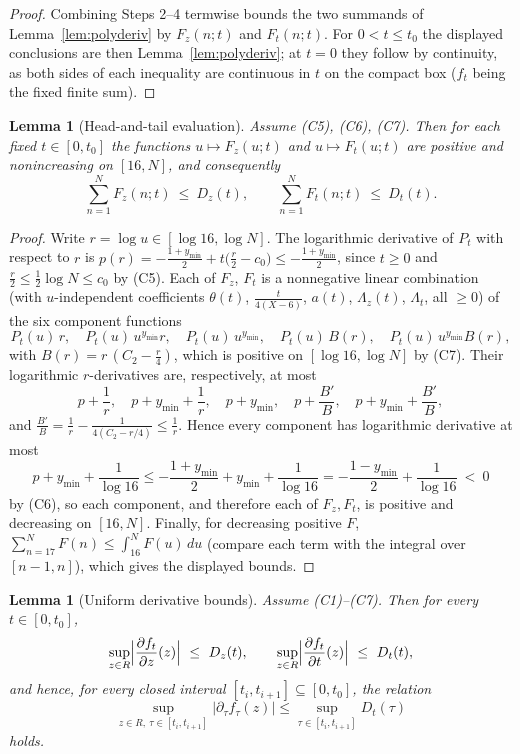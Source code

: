 \documentclass[11pt]{article}
\newtheorem{lemma}[theorem]{Lemma}
\theoremstyle{definition}
\begin{document}
\begin{proof}
Combining Steps 2--4 termwise bounds the two summands of
Lemma~\ref{lem:polyderiv} by $F_z(n;t)$ and $F_t(n;t)$. For
$0<t\le t_0$ the displayed conclusions are then
Lemma~\ref{lem:polyderiv}; at $t=0$ they follow by continuity, as
both sides of each inequality are continuous in $t$ on the compact
box ($f_t$ being the fixed finite sum).
\end{proof}

\begin{lemma}[Head-and-tail evaluation]\label{lem:headtail}
Assume (C5), (C6), (C7). Then for each fixed $t\in[0,t_0]$ the
functions $u\mapsto F_z(u;t)$ and $u\mapsto F_t(u;t)$ are positive
and nonincreasing on $[16,N]$, and consequently
\[
\sum_{n=1}^{N}F_z(n;t)\ \le\ D_z(t),
\qquad
\sum_{n=1}^{N}F_t(n;t)\ \le\ D_t(t).
\]
\end{lemma}

\begin{proof}
Write $r=\log u\in[\log16,\log N]$. The logarithmic derivative of
$P_t$ with respect to $r$ is
$p(r)=-\frac{1+y_{\min}}2+t\bigl(\frac r2-c_0\bigr)
\le-\frac{1+y_{\min}}2$, since $t\ge0$ and
$\frac r2\le\frac12\log N\le c_0$ by (C5). Each of $F_z$, $F_t$ is
a nonnegative linear combination (with $u$-independent
coefficients $\theta(t)$, $\frac t{4(X-6)}$, $a(t)$,
$\Lambda_z(t)$, $\Lambda_t$, all $\ge0$) of the six component
functions
\[
P_t(u)\,r,\quad P_t(u)\,u^{y_{\min}}r,\quad
P_t(u)\,u^{y_{\min}},\quad
P_t(u)\,B(r),\quad P_t(u)\,u^{y_{\min}}B(r),
\]
with $B(r)=r\,(C_2-\frac r4)$, which is positive on
$[\log16,\log N]$ by (C7). Their logarithmic $r$-derivatives are,
respectively, at most
\[
p+\frac1r,\quad p+y_{\min}+\frac1r,\quad p+y_{\min},\quad
p+\frac{B'}B,\quad p+y_{\min}+\frac{B'}B,
\]
and $\frac{B'}B=\frac1r-\frac1{4(C_2-r/4)}\le\frac1r$. Hence every
component has logarithmic derivative at most
\[
p+y_{\min}+\frac1{\log16}
\le-\frac{1+y_{\min}}2+y_{\min}+\frac1{\log16}
=-\frac{1-y_{\min}}2+\frac1{\log16}\ <\ 0
\]
by (C6), so each component, and therefore each of $F_z,F_t$, is
positive and decreasing on $[16,N]$. Finally, for decreasing
positive $F$,
$\sum_{n=17}^{N}F(n)\le\int_{16}^{N}F(u)\,du$ (compare each term
with the integral over $[n-1,n]$), which gives the displayed
bounds.
\end{proof}

\begin{lemma}[Uniform derivative bounds]\label{lem:derivbox}
Assume (C1)--(C7). Then for every $t\in[0,t_0]$,
\[
\sup_{z\in R}\Bigl|\frac{\partial f_t}{\partial z}(z)\Bigr|
\ \le\ D_z(t),
\qquad
\sup_{z\in R}\Bigl|\frac{\partial f_t}{\partial t}(z)\Bigr|
\ \le\ D_t(t),
\]
and hence, for every closed interval
$[t_i,t_{i+1}]\subseteq[0,t_0]$, the relation
$$\sup_{z\in R,\ \tau\in[t_i,t_{i+1}]}|\partial_\tau f_\tau(z)|
\le\sup_{\tau\in[t_i,t_{i+1}]}D_t(\tau)$$
holds.
\end{lemma}
\end{document}

